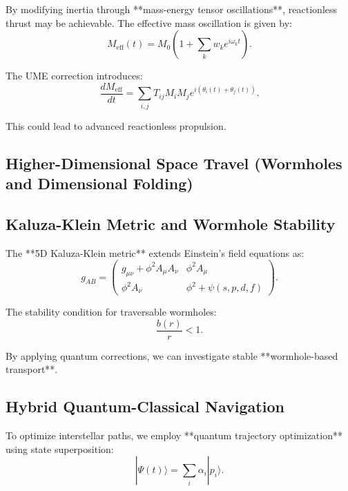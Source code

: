 \documentclass[12]{amsart}
\theoremstyle{plain}
\begin{document}
By modifying inertia through **mass-energy tensor oscillations**, reactionless thrust may be achievable. The effective mass oscillation is given by:
\begin{equation}
M_{\text{eff}}(t) = M_0 \left(1 + \sum_{k} w_k e^{i \omega_k t} \right).
\end{equation}

The UME correction introduces:
\begin{equation}
\frac{d M_{\text{eff}}}{dt} = \sum_{i,j} T_{ij} M_i M_j e^{i (\theta_i(t) + \theta_j(t))}.
\end{equation}

This could lead to advanced reactionless propulsion.

\subsection{Higher-Dimensional Space Travel (Wormholes and Dimensional Folding)}

\subsection{Kaluza-Klein Metric and Wormhole Stability}

The **5D Kaluza-Klein metric** extends Einstein’s field equations as:
\begin{equation}
g_{AB} =
\begin{pmatrix}
g_{\mu\nu} + \phi^2 A_{\mu} A_{\nu} & \phi^2 A_{\mu} \\
\phi^2 A_{\nu} & \phi^2 + \psi(s, p, d, f)
\end{pmatrix}.
\end{equation}

The stability condition for traversable wormholes:
\begin{equation}
\frac{b(r)}{r} < 1.
\end{equation}

By applying quantum corrections, we can investigate stable **wormhole-based transport**.

\subsection{Hybrid Quantum-Classical Navigation}

To optimize interstellar paths, we employ **quantum trajectory optimization** using state superposition:
\begin{equation}
| \Psi (t) \rangle = \sum_{i} \alpha_i | p_i \rangle.
\end{equation}
\end{document}
